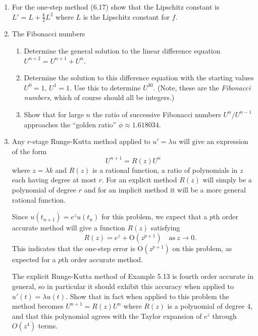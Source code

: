 \documentclass[10pt]{amsart}
\newcommand{\bigo}{{\mathrm O}}
\begin{document}
\begin{enumerate}[label={\bf Problem~{\arabic*}:}]
 \mline
 \item For the one-step method (6.17) show that the Lipschitz constant is $L' = L + \frac{k}{2} L^2$ where $L$ is the Lipschitz constant for $f$.




\mline 
\item  The Fibonacci numbers

\begin{enumerate}
\item Determine the general solution to the linear difference equation
$U^{n+2} = U^{n+1} + U^n$.

\item Determine the solution to this difference equation with the starting
values $U^0=1$, $U^1=1$.  Use this to determine $U^{30}$.
(Note, these are the {\em Fibonacci numbers}, which of course should all be
integers.)

\item Show that for large $n$ the ratio of successive Fibonacci numbers
$U^n/U^{n-1}$ approaches the ``golden ratio'' $\phi \approx 1.618034$.
\end{enumerate} 



\mline
\item 
Any $r$-stage Runge-Kutta method applied to $u'=\lambda u$ will give an
expression of the form
\[
U^{n+1} = R(z)U^n
\]
where $z=\lambda k$ and $R(z)$ is a rational function, a ratio of
polynomials in $z$ each having degree at most $r$.  For an explicit method
$R(z)$ will simply be a polynomial of degree $r$ and for an implicit method
it will be a more general rational function.

Since $u(t_{n+1}) = e^z u(t_n)$ for this problem, we expect that a $p$th
order accurate method will give a function $R(z)$ satisfying
\[
\qquad  R(z) = e^z + \bigo(z^{p+1}) \quad\text{as}~z \to 0.
\]
This indicates that the one-step error is $\bigo(z^{p+1})$ on this problem,
as expected for a $p$th order accurate method.

The explicit
Runge-Kutta method of Example 5.13 is fourth order accurate in general,
so in particular it should exhibit this accuracy when applied to 
$u'(t) = \lambda u(t)$.  Show that in fact when applied to this
problem the method becomes $U^{n+1} = R(z)U^n$ where $R(z)$ is 
a polynomial of degree 4, and that this polynomial agrees with the Taylor
expansion of $e^z$ through $O(z^4)$ terms.


\end{enumerate}
\end{document}
